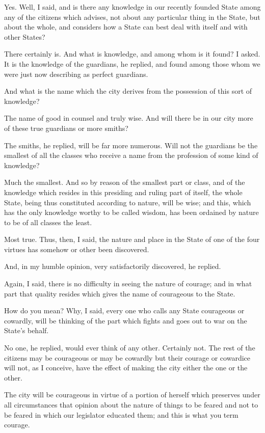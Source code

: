 Yes.
Well, I said, and is there any knowledge in our recently founded State among any of the citizens which advises, not about any particular thing in the State, but about the whole, and considers how a State can best deal with itself and with other States?

There certainly is.
And what is knowledge, and among whom is it found? I asked.
It is the knowledge of the guardians, he replied, and found among those whom we were just now describing as perfect guardians.

And what is the name which the city derives from the possession of this sort of knowledge?

The name of good in counsel and truly wise.
And will there be in our city more of these true guardians or more smiths?

The smiths, he replied, will be far more numerous.
Will not the guardians be the smallest of all the classes who receive a name from the profession of some kind of knowledge?

Much the smallest.
And so by reason of the smallest part or class, and of the knowledge which resides in this presiding and ruling part of itself, the whole State, being thus constituted according to nature, will be wise; and this, which has the only knowledge worthy to be called wisdom, has been ordained by nature to be of all classes the least.

Most true.
Thus, then, I said, the nature and place in the State of one of the four virtues has somehow or other been discovered.

And, in my humble opinion, very satisfactorily discovered, he replied.

Again, I said, there is no difficulty in seeing the nature of courage; and in what part that quality resides which gives the name of courageous to the State.

How do you mean?
Why, I said, every one who calls any State courageous or cowardly, will be thinking of the part which fights and goes out to war on the State's behalf.

No one, he replied, would ever think of any other.
Certainly not.
The rest of the citizens may be courageous or may be cowardly but their courage or cowardice will not, as I conceive, have the effect of making the city either the one or the other.

The city will be courageous in virtue of a portion of herself which preserves under all circumstances that opinion about the nature of things to be feared and not to be feared in which our legislator educated them; and this is what you term courage.

